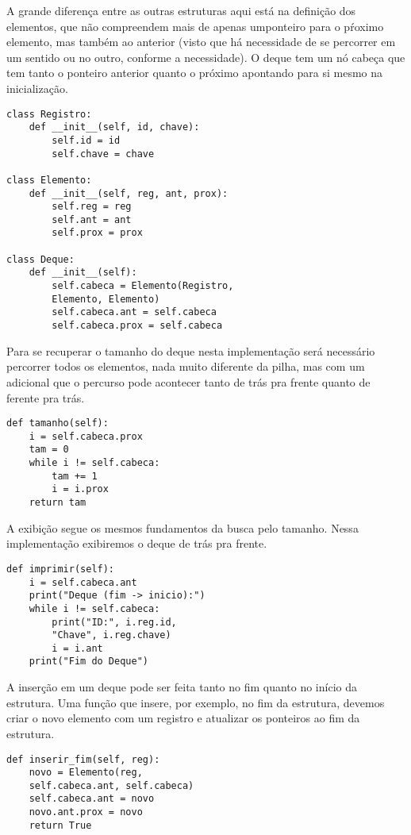 \documentclass[a4paper, twocolumn]{article}
\theoremstyle{definition}
\begin{document}
A grande diferença entre as outras estruturas aqui está na definição dos elementos, que não compreendem mais de apenas umponteiro para o pŕoximo elemento, mas também ao anterior (visto que há necessidade de se percorrer em um sentido ou no outro, conforme a necessidade). O deque tem um nó cabeça que tem tanto o ponteiro anterior quanto o próximo apontando para si mesmo na inicialização.

\begin{lstlisting}[label=deque_estrutura, caption= Deque (estrutura)]
class Registro:
    def __init__(self, id, chave):
        self.id = id
        self.chave = chave

class Elemento:
    def __init__(self, reg, ant, prox):
        self.reg = reg
        self.ant = ant
        self.prox = prox

class Deque:
    def __init__(self):
        self.cabeca = Elemento(Registro, 
        Elemento, Elemento)
        self.cabeca.ant = self.cabeca
        self.cabeca.prox = self.cabeca
\end{lstlisting}

Para se recuperar o tamanho do deque nesta implementação será necessário percorrer todos os elementos, nada muito diferente da pilha, mas com um adicional que o percurso pode acontecer tanto de trás pra frente quanto de ferente pra trás.

\begin{lstlisting}[label=deque_tamanho, caption= Deque (tamanho)]
def tamanho(self):
    i = self.cabeca.prox
    tam = 0
    while i != self.cabeca:
        tam += 1
        i = i.prox
    return tam
\end{lstlisting}

A exibição segue os mesmos fundamentos da busca pelo tamanho. Nessa implementação exibiremos o deque de trás pra frente.
\begin{lstlisting}[label=deque_imprimir, caption= Deque (exibição)]
def imprimir(self):
    i = self.cabeca.ant
    print("Deque (fim -> inicio):")
    while i != self.cabeca:
        print("ID:", i.reg.id, 
        "Chave", i.reg.chave)
        i = i.ant
    print("Fim do Deque")
\end{lstlisting}

A inserção em um deque pode ser feita tanto no fim quanto no início da estrutura. Uma função que insere, por exemplo, no fim da estrutura, devemos criar o novo elemento com um registro e atualizar os ponteiros ao fim da estrutura.
\begin{lstlisting}[label=deque_inserir, caption= Deque (inserção no fim)]
def inserir_fim(self, reg):
    novo = Elemento(reg, 
    self.cabeca.ant, self.cabeca)
    self.cabeca.ant = novo
    novo.ant.prox = novo
    return True
\end{lstlisting}
\end{document}
